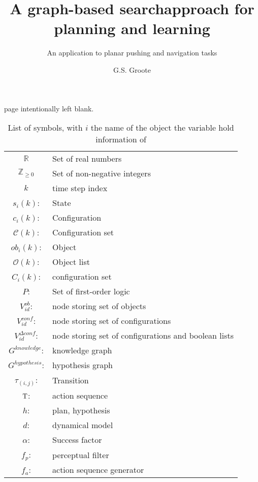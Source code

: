 \documentclass{layout/tudelft-report}
\begin{document}
\frontmatter

\title{A graph-based search\newline approach for planning and learning}

\subtitle{An application to planar pushing and navigation tasks} 

\author{G.S. Groote}
\subject{SC52045: System \& Control Thesis Report}

%
\makecover
page intentionally left blank.
\newpage



\tableofcontents
\listoffigures
\listoftables
\newpage
\begin{table}[H]
    \centering
    \begin{tabular}{c l}
      $\mathbb{R}$ & \textrm{Set of real numbers}\\
      $\mathbb{Z}_{\geq 0}$ & \textrm{Set of non-negative integers}\\
      $k$ & \textrm{time step index}\\
      $s_i(k)$: & \textrm{State}\\
      $c_i(k)$: & \textrm{Configuration}\\
      $\mathcal{C}(k)$: & \textrm{Configuration set} \\
      $ob_i(k)$: & \textrm{Object}\\
      $\mathcal{O}(k)$: & \textrm{Object list}\\
      $C_i(k)$: & \textrm{configuration set}\\
      $P$: & \textrm{Set of first-order logic}\\
      $V^{ob}_{id}$: & \textrm{node storing set of objects}\\
      $V^{conf}_{id}$: & \textrm{node storing set of configurations}\\
      $V^{\Delta conf}_{id}$: & \textrm{node storing set of configurations and boolean lists}\\
      $G^{knowledge}$: & \textrm{knowledge graph}\\
      $G^{hypothesis}$: & \textrm{hypothesis graph}\\
      $\tau_{(i,j)}$: & \textrm{Transition}\\
      $\mathrm{T}$: & \textrm{action sequence}\\
      $h$: & \textrm{plan, hypothesis}\\
      $d$: & \textrm{dynamical model}\\
      $\alpha$: & Success factor\\
      $f_p$: & \textrm{perceptual filter}\\
      $f_a$: & \textrm{action sequence generator}\\
    \end{tabular}
    \caption{List of symbols, with $i$ the name of the object the variable hold information of}
    \label{tab: symbol list}
\end{table}
\end{document}
